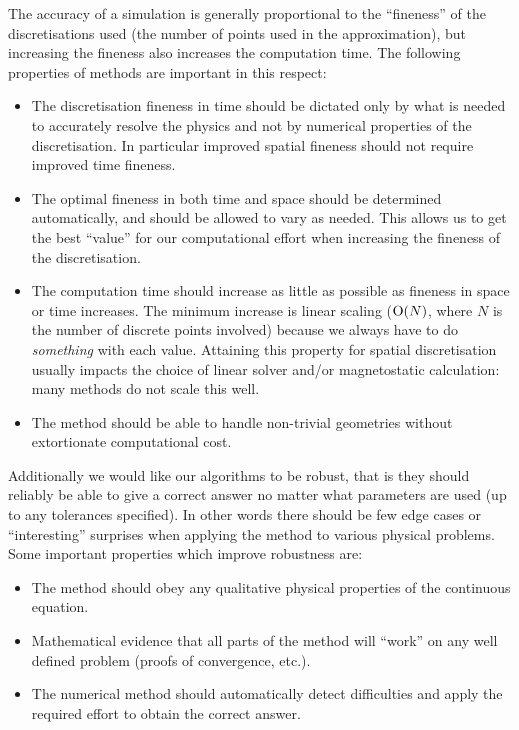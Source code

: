 The accuracy of a simulation is generally proportional to the ``fineness''  of the discretisations used (\ie the number of points used in the approximation), but increasing the fineness also increases the computation time.
The following properties of methods are important in this respect:
\begin{itemize}
\item The discretisation fineness in time should be dictated only by what is needed to accurately resolve the physics and not by numerical properties of the discretisation.
  In particular improved spatial fineness should not require improved time fineness.

\item The optimal fineness in both time and space should be determined automatically, and should be allowed to vary as needed.
  This allows us to get the best ``value'' for our computational effort when increasing the fineness of the discretisation.

\item The computation time should increase as little as possible as fineness in space or time increases.
  The minimum increase is linear scaling ($\mathrm{O}{\left( N \right)}$, where $N$ is the number of discrete points involved) because we always have to do \emph{something} with each value.
  Attaining this property for spatial discretisation usually impacts the choice of linear solver and/or magnetostatic calculation: many methods do not scale this well.

\item The method should be able to handle non-trivial geometries without extortionate computational cost.
\end{itemize}

Additionally we would like our algorithms to be robust, that is they should reliably be able to give a correct answer no matter what parameters are used (up to any tolerances specified).
In other words there should be few edge cases or ``interesting'' surprises when applying the method to various physical problems.
Some important properties which improve robustness are:
\begin{itemize}
\item The method should obey any qualitative physical properties of the continuous equation.

\item Mathematical evidence that all parts of the method will ``work'' on any well defined problem (\eg proofs of convergence, etc.).

\item The numerical method should automatically detect difficulties and apply the required effort to obtain the correct answer.
\end{itemize}


